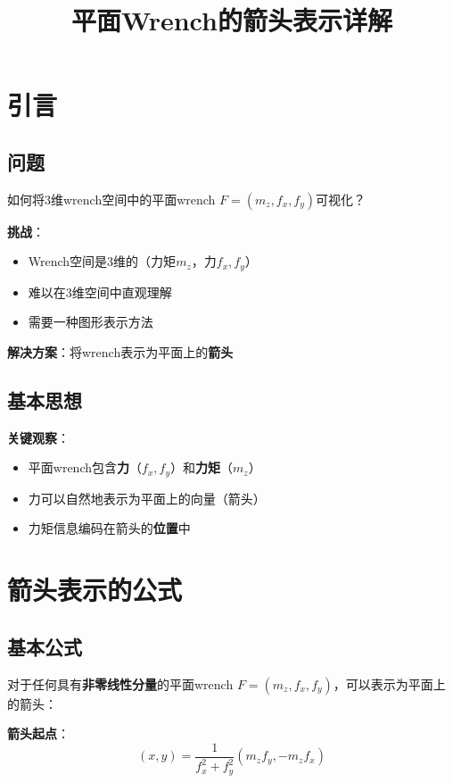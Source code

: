 \documentclass[12pt,a4paper]{article}
\title{平面Wrench的箭头表示详解}
\author{}
\date{}
\begin{document}
\maketitle

\section{引言}

\subsection{问题}

如何将3维wrench空间中的平面wrench $F = (m_z, f_x, f_y)$可视化？

\textbf{挑战}：
\begin{itemize}
\item Wrench空间是3维的（力矩$m_z$，力$f_x, f_y$）
\item 难以在3维空间中直观理解
\item 需要一种图形表示方法
\end{itemize}

\textbf{解决方案}：将wrench表示为平面上的\textbf{箭头}

\subsection{基本思想}

\textbf{关键观察}：
\begin{itemize}
\item 平面wrench包含\textbf{力}（$f_x, f_y$）和\textbf{力矩}（$m_z$）
\item 力可以自然地表示为平面上的向量（箭头）
\item 力矩信息编码在箭头的\textbf{位置}中
\end{itemize}

\section{箭头表示的公式}

\subsection{基本公式}

对于任何具有\textbf{非零线性分量}的平面wrench $F = (m_z, f_x, f_y)$，可以表示为平面上的箭头：

\textbf{箭头起点}：
\begin{equation}
(x, y) = \frac{1}{f_x^2 + f_y^2} (m_z f_y, -m_z f_x)
\label{eq:arrow_base}
\end{equation}
\end{document}
